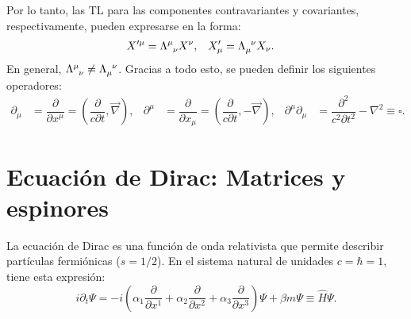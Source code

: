 Por lo tanto, las TL para las componentes contravariantes y covariantes, respectivamente, pueden expresarse \cite{MCR} en la forma:
\begin{align}
X'^{\mu } &=\Lambda\indices{^\mu _\nu}X^\nu , & X'_{\mu } &=\Lambda\indices{_\mu ^\nu}X_\nu . \label{eq:LTcovariant}
\end{align}
En general, $\Lambda\indices{^\mu _\nu} \neq \Lambda\indices{_\mu ^\nu}$.  Gracias a todo esto, se pueden definir los siguientes operadores:
\begin{align}
\partial _{\mu} &= \dfrac{\partial}{\partial x^{\mu}}=\left( \dfrac{\partial }{c\partial t},\vec{\nabla} \right), & \partial ^{\mu } &= \dfrac{\partial }{\partial x_{\mu }}=\left( \dfrac{\partial }{c\partial t},-\vec{\nabla} \right), & \partial ^{\mu }\partial _{\mu }&= \dfrac{\partial ^{2}}{c^{2}\partial t^{2}}-\nabla ^{2} \equiv\square .
\end{align}
\vspace{5mm}

\section{Ecuación de Dirac: Matrices y espinores}\label{sec:Dirac}
La ecuación de Dirac es una función de onda relativista que permite describir partículas fermiónicas ($s=1/2$). En el sistema natural de unidades $c=\hbar =1$, tiene esta expresión:
\begin{equation}
i\partial _{t}\Psi = -i\left( \alpha _{1}\dfrac{\partial }{\partial x^{1}}+\alpha _{2}\dfrac{\partial }{\partial x^{2}} + \alpha _{3}\dfrac{\partial }{\partial x^{3}}\right) \Psi +\beta m\Psi \equiv\widehat{H}\Psi . \label{eq:Dirac}
\end{equation}

